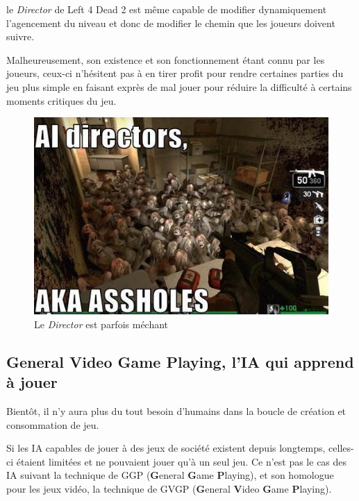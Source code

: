 \documentclass[a4paper, 12pt]{article} %
\begin{document}
le \textit{Director} de Left 4 Dead 2 est même capable de modifier dynamiquement l’agencement du niveau et donc de modifier le chemin que les joueurs doivent suivre.

Malheureusement, son existence et son fonctionnement étant connu par les joueurs, ceux-ci n’hésitent pas à en tirer profit pour rendre certaines parties du jeu plus simple en faisant exprès de mal jouer pour réduire la difficulté à certains moments critiques du jeu.

\begin{figure}[!h]%
	\begin{center} 
		\includegraphics[width=0.80\columnwidth]{images/aiDirector2.jpg}%
		\caption{Le \textit{Director} est parfois méchant}%
	\end{center}
\end{figure}


\newpage
\subsection{General Video Game Playing, l'IA qui apprend à jouer}

Bientôt, il n’y aura plus du tout besoin d’humains dans la boucle de création et consommation de jeu.

Si les IA capables de jouer à des jeux de société existent depuis longtemps, celles-ci étaient limitées et ne pouvaient jouer qu’à un seul jeu. Ce n’est pas le cas des IA suivant la technique de GGP (\textbf{G}eneral \textbf{G}ame \textbf{P}laying), et son homologue pour les jeux vidéo, la technique de GVGP (\textbf{G}eneral \textbf{V}ideo \textbf{G}ame \textbf{P}laying).
\end{document}
